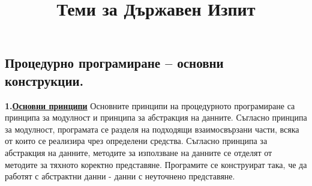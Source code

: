 \documentclass{article}
\begin{document}
\title{Теми за Държавен Изпит}
\author{}
\maketitle

\subsection*{Процедурно програмиране – основни конструкции.}

\textbf{1.\underline{Основни принципи}} \newline\newline
Основните принципи на процедурното програмиране са принципа за модулност и принципа за абстракция на данните. Съгласно принципа
за модулност, програмата се разделя на подходящи взаимосвързани части, всяка от които се реализира чрез определени средства.
Съгласно принципа за абстракция на данните, методите за използване на данните се отделят от методите за тяхното коректно
представяне. Програмите се конструират така, че да работят с абстрактни данни - данни с неуточнено представяне. 
\end{document}
